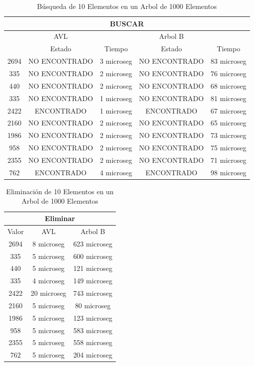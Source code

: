 \documentclass[acmsmall]{acmart}
\begin{document}
\begin{table}[t]
\begin{center}
  \caption{Búsqueda de 10 Elementos en un Arbol de 1000 Elementos}
  \begin{tabular}{ccccc}
    \toprule
    \multicolumn{5}{c}{BUSCAR}\\
    \midrule
     \, & AVL &\, & Arbol B & \,\\
     \, &Estado&Tiempo&Estado&Tiempo \\
      2694 &NO ENCONTRADO&3 microseg&NO ENCONTRADO&83 microseg \\
      335 &NO ENCONTRADO&2 microseg&NO ENCONTRADO&76 microseg \\
      440 &NO ENCONTRADO&2 microseg&NO ENCONTRADO&68 microseg \\
      335 &NO ENCONTRADO&1 microseg&NO ENCONTRADO&81 microseg \\
      2422 & ENCONTRADO&1 microseg& ENCONTRADO&67 microseg \\
      2160 &NO ENCONTRADO&2 microseg&NO ENCONTRADO&65 microseg \\
      1986 &NO ENCONTRADO&2 microseg&NO ENCONTRADO&73 microseg \\
      958 &NO ENCONTRADO&2 microseg&NO ENCONTRADO&75 microseg \\
       2355 &NO ENCONTRADO&2 microseg&NO ENCONTRADO&71 microseg \\
      762 &ENCONTRADO&4 microseg&ENCONTRADO&98 microseg \\

    \bottomrule
  \end{tabular}
  \end{center}
\end{table}


\begin{table}[htbp]
\begin{center}
  \caption{Eliminación de 10 Elementos en un Arbol de 1000 Elementos}
  \begin{tabular}{ccc}
    \toprule
    \multicolumn{3}{c}{Eliminar}\\
    \midrule
     Valor & AVL & Arbol B\\
     2694 &8 microseg&623 microseg \\
      335 &5 microseg&600 microseg \\
      440 &5 microseg&121 microseg \\
      335 &4 microseg&149 microseg \\
      2422 &20 microseg& 743 microseg \\
      2160 &5 microseg&80 microseg \\
      1986 &5 microseg&123 microseg \\
      958 &5 microseg&583 microseg \\
       2355 &5 microseg&558 microseg \\
      762 &5 microseg&204 microseg \\


    \bottomrule
  \end{tabular}
  \end{center}
\end{table}
\clearpage
\end{document}
